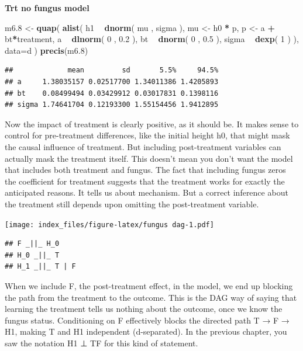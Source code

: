 \documentclass[
]{article}
\newenvironment{Shaded}{\begin{snugshade}}{\end{snugshade}}
\newcommand{\DataTypeTok}[1]{\textcolor[rgb]{0.13,0.29,0.53}{#1}}
\newcommand{\DecValTok}[1]{\textcolor[rgb]{0.00,0.00,0.81}{#1}}
\newcommand{\FloatTok}[1]{\textcolor[rgb]{0.00,0.00,0.81}{#1}}
\newcommand{\KeywordTok}[1]{\textcolor[rgb]{0.13,0.29,0.53}{\textbf{#1}}}
\newcommand{\NormalTok}[1]{#1}
\newcommand{\OperatorTok}[1]{\textcolor[rgb]{0.81,0.36,0.00}{\textbf{#1}}}
\newcommand{\StringTok}[1]{\textcolor[rgb]{0.31,0.60,0.02}{#1}}
\begin{document}
\textbf{Trt no fungus model}

\begin{Shaded}
\begin{Highlighting}[]
\NormalTok{m6}\FloatTok{.8}\NormalTok{ <-}\StringTok{ }\KeywordTok{quap}\NormalTok{( }\KeywordTok{alist}\NormalTok{(}
\NormalTok{h1 }\OperatorTok{~}\StringTok{ }\KeywordTok{dnorm}\NormalTok{( mu , sigma ), }
\NormalTok{mu <-}\StringTok{ }\NormalTok{h0 }\OperatorTok{*}\StringTok{ }\NormalTok{p,}
\NormalTok{p <-}\StringTok{ }\NormalTok{a }\OperatorTok{+}\StringTok{ }\NormalTok{bt}\OperatorTok{*}\NormalTok{treatment,}
\NormalTok{a }\OperatorTok{~}\StringTok{ }\KeywordTok{dlnorm}\NormalTok{( }\DecValTok{0}\NormalTok{ , }\FloatTok{0.2}\NormalTok{ ), }
\NormalTok{bt }\OperatorTok{~}\StringTok{ }\KeywordTok{dnorm}\NormalTok{( }\DecValTok{0}\NormalTok{ , }\FloatTok{0.5}\NormalTok{ ), }
\NormalTok{sigma }\OperatorTok{~}\StringTok{ }\KeywordTok{dexp}\NormalTok{( }\DecValTok{1}\NormalTok{ )}
\NormalTok{), }\DataTypeTok{data=}\NormalTok{d ) }
\KeywordTok{precis}\NormalTok{(m6}\FloatTok{.8}\NormalTok{)}
\end{Highlighting}
\end{Shaded}

\begin{verbatim}
##             mean         sd       5.5%     94.5%
## a     1.38035157 0.02517700 1.34011386 1.4205893
## bt    0.08499494 0.03429912 0.03017831 0.1398116
## sigma 1.74641704 0.12193300 1.55154456 1.9412895
\end{verbatim}

Now the impact of treatment is clearly positive, as it should be. It
makes sense to control for pre-treatment differences, like the initial
height h0, that might mask the causal influence of treatment. But
including post-treatment variables can actually mask the treatment
itself. This doesn't mean you don't want the model that includes both
treatment and fungus. The fact that including fungus zeros the
coefficient for treatment suggests that the treatment works for exactly
the anticipated reasons. It tells us about mechanism. But a correct
inference about the treatment still depends upon omitting the
post-treatment variable.

\texttt{[image: index\_files/figure-latex/fungus dag-1.pdf]}

\begin{verbatim}
## F _||_ H_0
## H_0 _||_ T
## H_1 _||_ T | F
\end{verbatim}

When we include F, the post-treatment effect, in the model, we end up
blocking the path from the treatment to the outcome. This is the DAG way
of saying that learning the treatment tells us nothing about the
outcome, once we know the fungus status. Conditioning on F effectively
blocks the directed path T → F → H1, making T and H1 independent
(d-separated). In the previous chapter, you saw the notation H1 ⊥
T\textbar F for this kind of statement.
\end{document}
